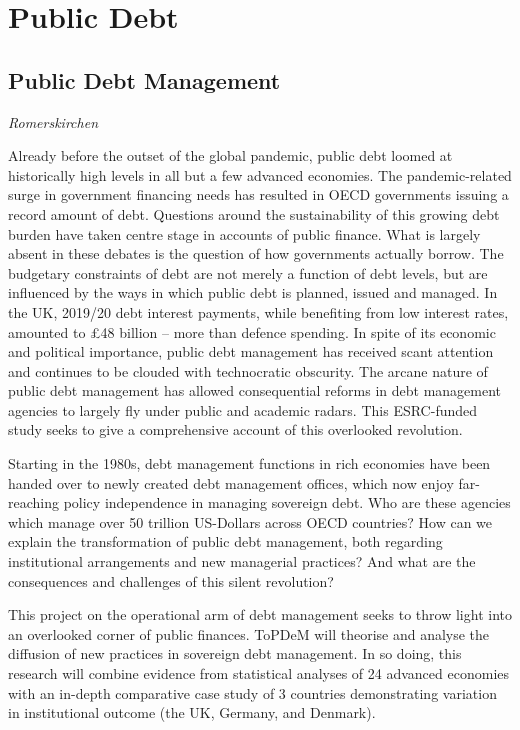 \documentclass[
]{book}
\begin{document}
\hypertarget{public-debt}{%
\chapter{Public Debt}\label{public-debt}}

\hypertarget{public-debt-management}{%
\section{Public Debt Management}\label{public-debt-management}}

\emph{Romerskirchen}

Already before the outset of the global pandemic, public debt loomed at historically high levels in all but a few advanced economies. The pandemic-related surge in government financing needs has resulted in OECD governments issuing a record amount of debt. Questions around the sustainability of this growing debt burden have taken centre stage in accounts of public finance. What is largely absent in these debates is the question of how governments actually borrow. The budgetary constraints of debt are not merely a function of debt levels, but are influenced by the ways in which public debt is planned, issued and managed. In the UK, 2019/20 debt interest payments, while benefiting from low interest rates, amounted to £48 billion -- more than defence spending. In spite of its economic and political importance, public debt management has received scant attention and continues to be clouded with technocratic obscurity. The arcane nature of public debt management has allowed consequential reforms in debt management agencies to largely fly under public and academic radars. This ESRC-funded study seeks to give a comprehensive account of this overlooked revolution.

Starting in the 1980s, debt management functions in rich economies have been handed over to newly created debt management offices, which now enjoy far-reaching policy independence in managing sovereign debt. Who are these agencies which manage over 50 trillion US-Dollars across OECD countries? How can we explain the transformation of public debt management, both regarding institutional arrangements and new managerial practices? And what are the consequences and challenges of this silent revolution?

This project on the operational arm of debt management seeks to throw light into an overlooked corner of public finances. ToPDeM will theorise and analyse the diffusion of new practices in sovereign debt management. In so doing, this research will combine evidence from statistical analyses of 24 advanced economies with an in-depth comparative case study of 3 countries demonstrating variation in institutional outcome (the UK, Germany, and Denmark).
\end{document}
